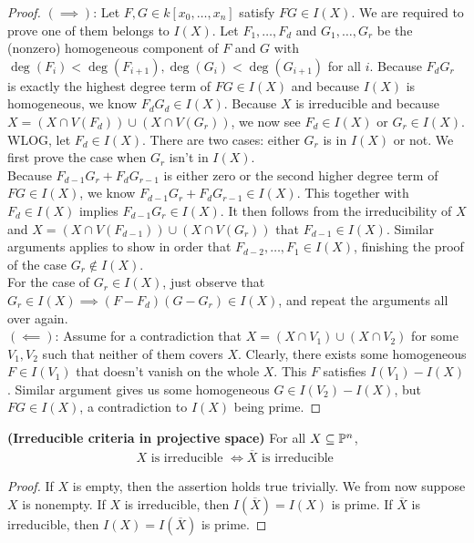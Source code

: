 \documentclass{report}
\begin{document}
\begin{proof}
$(\implies )$: Let $F,G \in k[x_0,\dots ,x_n]$ satisfy $FG \in I(X)$. We are required to prove one of them belongs to $I(X)$. Let $F_1,\dots ,F_{d}$ and $G_1,\dots ,G_r$ be the (nonzero) homogeneous component of $F$ and $G$ with $\operatorname{deg}(F_i)<\operatorname{deg}(F_{i+1}),\operatorname{deg}(G_i)<\operatorname{deg}(G_{i+1})$ for all $i$. Because $F_dG_r$ is exactly the highest degree term  of $FG \in I(X)$ and because $I(X)$ is homogeneous, we know $F_dG_d \in I(X)$. Because $X$ is irreducible and because  $X=(X\cap V(F_d))\cup  (X\cap V(G_r))$, we now see $F_d \in I(X)$ or $G_r \in I(X)$. \\

WLOG, let $F_d \in I(X)$. There are two cases: either $G_r$ is in $I(X)$ or not. We first prove the case when $G_r$ isn't in $I(X)$. \\

Because $F_{d-1}G_r +F_dG_{r-1}$ is either zero or the second higher degree term of $FG \in I(X)$, we know $F_{d-1}G_r +F_dG_{r-1}\in I(X)$. This together with $F_d \in I(X)$ implies $F_{d-1}G_r \in I(X)$. It then follows from the  irreducibility of $X$ and $X=(X\cap V(F_{d-1}))\cup (X\cap V(G_r))$ that $F_{d-1}\in I(X)$. Similar arguments applies to show in order that $F_{d-2},\dots ,F_1 \in I(X)$, finishing the proof of the case $G_r \not \in  I(X)$. \\

For the case of $G_r \in I(X)$, just observe that $G_r \in I(X)\implies (F-F_d)(G-G_r)\in I(X)$, and repeat the arguments all over again.\\










$(\impliedby)$: Assume for a contradiction that $X=(X\cap V_1)\cup (X\cap V_2)$ for some $V_1,V_2$ such that neither of them covers $X$. Clearly, there exists some homogeneous $F \in I(V_1)$ that doesn't vanish on the whole $X$. This $F$ satisfies $I(V_1)-I(X)$. Similar argument gives us some homogeneous $G \in I(V_2)-I(X)$, but $FG \in I(X)$, a contradiction to $I(X)$ being prime. 
\end{proof}
\begin{corollary}
\label{Icips}
\textbf{(Irreducible criteria in projective space)} For all $X\subseteq \P^n$, 
\begin{align*}
X\text{ is irreducible }\iff \overline{X}\text{ is irreducible }
\end{align*}
\end{corollary}
\begin{proof}
If $X$ is empty, then the assertion holds true trivially. We from now suppose  $X$ is nonempty. If $X$ is irreducible, then $I(\overline{X})=I(X)$ is prime. If $\overline{X}$ is irreducible, then $I(X)=I(\overline{X})$ is prime. 
\end{proof}
\end{document}
